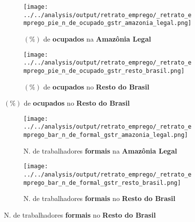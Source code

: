 \documentclass[11pt]{beamer}
\begin{document}
\begin{frame}[label=_retrato_emprego_pie_n_de_ocupado_gstr]{}
\textit{\hyperlink{indice_principal}{}}
\begin{figure}
\centering
\begin{subfigure}{.5\textwidth}
  \centering
  \texttt{[image: ../../analysis/output/retrato\_emprego/\_retrato\_emprego\_pie\_n\_de\_ocupado\_gstr\_amazonia\_legal.png]}
  \label{fig:_retrato_emprego_pie_n_de_ocupado_gstr_amazonia_legal}
  \caption{{\tiny $(\%)$ de \textbf{ocupados} na \textbf{Amazônia Legal}}}
\end{subfigure}%
\begin{subfigure}{.5\textwidth}
  \centering
  \texttt{[image: ../../analysis/output/retrato\_emprego/\_retrato\_emprego\_pie\_n\_de\_ocupado\_gstr\_resto\_brasil.png]}
  \label{fig:_retrato_emprego_pie_n_de_ocupado_gstr_resto_brasil}
   \caption{{\tiny $(\%)$ de \textbf{ocupados} no \textbf{Resto do Brasil}}}
\end{subfigure}
\end{figure}
\end{frame}


\begin{frame}[label=_retrato_emprego_bar_n_de_formal_gstr]{}
\textit{\hyperlink{indice_principal}{}}
\begin{figure}
\centering
\begin{subfigure}{.5\textwidth}
  \centering
  \texttt{[image: ../../analysis/output/retrato\_emprego/\_retrato\_emprego\_bar\_n\_de\_formal\_gstr\_amazonia\_legal.png]}
  \label{fig:_retrato_emprego_bar_n_de_formal_gstr_amazonia_legal}
  \caption{{\tiny N. de trabalhadores \textbf{formais} na \textbf{Amazônia Legal}}}
\end{subfigure}%
\begin{subfigure}{.5\textwidth}
  \centering
  \texttt{[image: ../../analysis/output/retrato\_emprego/\_retrato\_emprego\_bar\_n\_de\_formal\_gstr\_resto\_brasil.png]}
  \label{fig:_retrato_emprego_bar_n_de_formal_gstr_resto_brasil}
   \caption{{\tiny N. de trabalhadores \textbf{formais} no \textbf{Resto do Brasil}}}
\end{subfigure}
\end{figure}
\end{frame}
\end{document}
